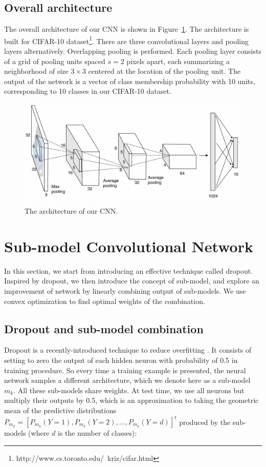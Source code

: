 \documentclass{article} %
\begin{document}
\subsection{Overall architecture}
The overall architecture of our CNN is shown in Figure~\ref{fig1}. The architecture is built for CIFAR-10 dataset\footnote{http://www.cs.toronto.edu/~kriz/cifar.html}. There are three convolutional layers and pooling layers alternatively. Overlapping pooling is performed. Each pooling layer consists of a grid of pooling units spaced $s=2$ pixels apart, each summarizing a neighborhood of size $3\times3$ centered at the location of the pooling unit. The output of the network is a vector of class membership probability with 10 units, corresponding to 10 classes in our CIFAR-10 dataset.

\begin{figure}
\centering
\includegraphics[width=1\textwidth]{architecture}
\caption{The architecture of our CNN.}
\label{fig1}
\end{figure}

\section{Sub-model Convolutional Network}
In this section, we start from introducing an effective technique called dropout. Inspired by dropout, we then introduce the concept of sub-model, and explore an improvement of network by linearly combining output of sub-models. We use convex optimization to find optimal weights of the combination.

\subsection{Dropout and sub-model combination}
Dropout is a recently-introduced technique to reduce overfitting \cite{imagenet}. It consists of setting to zero the output of each hidden neuron with probability of 0.5 in training procedure.  So every time a training example is presented, the neural network samples a different architecture, which we denote here as a sub-model $m_{k}$. All these sub-models share weights. At test time, we use all neurons but multiply their outputs by 0.5, which is an approximation to taking the geometric mean of the predictive distributions $P_{m_{k}}=\left [ P_{m_{k}}(Y=1),P_{m_{k}}(Y=2),...,P_{m_{k}}(Y=d) \right ]^{t}$ produced by the sub-models (where $d$ is the number of classes):
\end{document}

